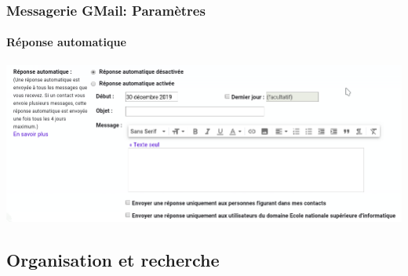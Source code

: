 \documentclass[xcolor=table]{beamer}
\begin{document}
\begin{frame}
\frametitle{Messagerie GMail: Paramètres}
\framesubtitle{Réponse automatique}

\begin{center}
	\includegraphics[height=.85\textheight]{..//img/Bweb02-ri-gmail/gmail-parametre-reponse.png}
\end{center}

\end{frame}

\subsection{Organisation et recherche}
\end{document}
